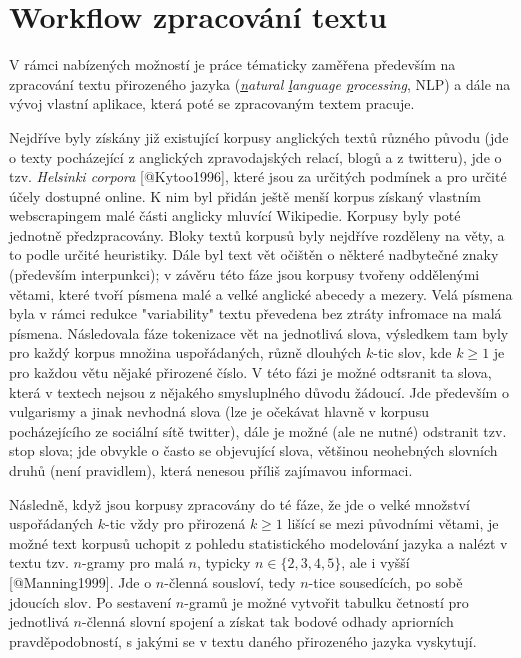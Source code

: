 
\section{Workflow zpracování textu}

V rámci nabízených možností je práce tématicky zaměřena především na
zpracování textu přirozeného jazyka (\textit{\underline{n}atural
\underline{l}anguage \underline{p}rocessing}, NLP) a dále na vývoj
vlastní aplikace, která poté se zpracovaným textem pracuje.

Nejdříve byly získány již existující korpusy anglických textů různého
původu (jde o texty pocházející z anglických zpravodajských relací, blogů
a z twitteru), jde o tzv. \textit{Helsinki corpora} [@Kytoo1996], které
jsou za určitých podmínek a pro určité účely dostupné online. K nim byl
přidán ještě menší korpus získaný vlastním webscrapingem malé části
anglicky mluvící Wikipedie. Korpusy byly poté jednotně předzpracovány.
Bloky textů korpusů byly nejdříve rozděleny na věty, a to podle určité
heuristiky. Dále byl text vět očištěn o některé nadbytečné znaky
(především interpunkci); v závěru této fáze jsou korpusy tvořeny
oddělenými větami, které tvoří písmena malé a velké anglické abecedy
a mezery. Velá písmena byla v rámci redukce "variability" textu převedena
bez ztráty infromace na malá písmena. Následovala fáze tokenizace vět
na jednotlivá slova, výsledkem tam byly pro každý korpus množina
uspořádaných, různě dlouhých $k$-tic slov, kde $k \geq 1$ je pro každou
větu nějaké přirozené číslo. V této fázi je možné odtsranit ta slova,
která v textech nejsou z nějakého smysluplného důvodu žádoucí. Jde
především o vulgarismy a jinak nevhodná slova (lze je očekávat hlavně
v korpusu pocházejícího ze sociální sítě \textsf{twitter}), dále je
možné (ale ne nutné) odstranit tzv. stop slova; jde obvykle o často
se objevující slova, většinou neohebných slovních druhů (není pravidlem),
která nenesou příliš zajímavou informaci.

Následně, když jsou korpusy zpracovány do té fáze, že jde o velké
množství uspořádaných $k$-tic vždy pro přirozená $k \geq 1$ lišící se
mezi původními větami, je možné text korpusů uchopit z pohledu
statistického modelování jazyka a nalézt v textu tzv. $n$-gramy pro malá
$n$, typicky $n \in \{2, 3, 4, 5\}$, ale i vyšší [@Manning1999].
Jde o $n$-členná sousloví, tedy $n$-tice sousedících, po sobě
jdoucích slov. Po sestavení $n$-gramů je možné vytvořit tabulku
četností pro jednotlivá $n$-členná slovní spojení a získat tak bodové
odhady apriorních pravděpodobností, s jakými se v textu daného
přirozeného jazyka vyskytují.

